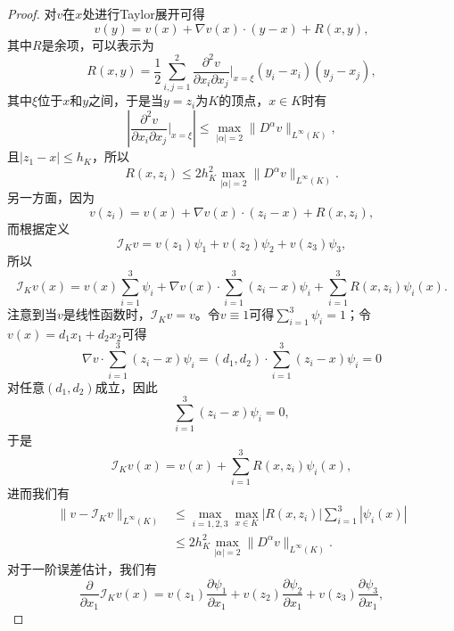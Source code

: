 \documentclass[a4paper,10pt]{ctexart}
\begin{document}
\begin{proof}
    对$ v $在$ x $处进行Taylor展开可得
    \[
        v(y) = v(x) + \nabla v(x)\cdot (y-x) + R(x,y),
    \]
    其中$ R $是余项，可以表示为
    \[
        R(x,y) = \frac{1}{2} \sum_{i,j=1}^2 \dfrac{\partial^2 v}{\partial x_i \partial x_j}|_{x=\xi} (y_i-x_i)(y_j-x_j),
    \]
    其中$ \xi $位于$ x $和$ y $之间，于是当$ y=z_i $为$ K $的顶点，$ x\in K $时有
    \[
        \left\vert \dfrac{\partial^2 v}{\partial x_i \partial x_j}|_{x=\xi} \right\vert \leqslant \max_{|\alpha|=2}\| D^\alpha v \|_{L^\infty(K)},
    \]
    且$ |z_1-x|\leqslant h_K $，所以
    \begin{equation}
        R(x,z_i) \leqslant 2h_K^2 \max_{|\alpha|=2}\| D^\alpha v \|_{L^\infty(K)}.
    \end{equation}
    另一方面，因为
    \[
        v(z_i) = v(x) + \nabla v(x)\cdot (z_i-x) + R(x,z_i),
    \]
    而根据定义
    \[
        \mathcal{I}_K v = v(z_1)\psi_1 + v(z_2)\psi_2 + v(z_3)\psi_3,
    \]
    所以
    \begin{equation}
        \mathcal{I}_K v(x) = v(x)\sum_{i=1}^3 \psi_i + \nabla v(x)\cdot \sum_{i=1}^3 (z_i-x)\psi_i + \sum_{i=1}^3 R(x,z_i)\psi_i(x).
    \end{equation}
    注意到当$ v $是线性函数时，$ \mathcal{I}_K v = v $。令$ v\equiv 1 $可得$ \sum_{i=1}^3 \psi_i = 1 $；令$ v(x) = d_1x_1+d_2x_2 $可得
    \[
        \nabla v\cdot\sum_{i=1}^3 (z_i-x)\psi_i = (d_1,d_2)\cdot \sum_{i=1}^3 (z_i-x)\psi_i = 0
    \]
    对任意$ (d_1,d_2) $成立，因此
    \[
        \sum_{i=1}^3 (z_i-x)\psi_i = 0,
    \]
    于是
    \begin{equation}
        \mathcal{I}_K v(x) = v(x) + \sum_{i=1}^3 R(x,z_i)\psi_i(x),
    \end{equation}
    进而我们有
    \begin{equation}
        \begin{aligned}
            \| v-\mathcal{I}_K v \|_{L^\infty(K)} &\leqslant \max_{i=1,2,3}\max_{x\in K}|R(x,z_i)|\sum_{i=1}^3 |\psi_i(x)|\\
            &\leqslant 2h_K^2 \max_{|\alpha|=2}\| D^\alpha v \|_{L^\infty(K)}.
        \end{aligned}
    \end{equation}
    对于一阶误差估计，我们有
    \begin{equation}
        \dfrac{\partial }{\partial x_1} \mathcal{I}_K v(x) = v(z_1) \dfrac{\partial \psi_1}{\partial x_1} + v(z_2) \dfrac{\partial \psi_2}{\partial x_1} + v(z_3) \dfrac{\partial \psi_3}{\partial x_1},
    \end{equation}

\end{proof}
\end{document}
